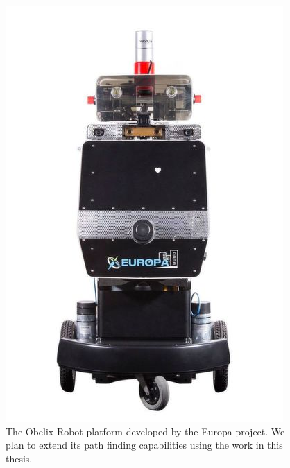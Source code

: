 \begin{figure}
	\centering
	\includegraphics[width=.3\textwidth]{figures/introduction/obelix.jpg}
	\caption{The Obelix Robot platform developed by the Europa project. We plan to extend its path finding capabilities using the work in this thesis.}
\end{figure}